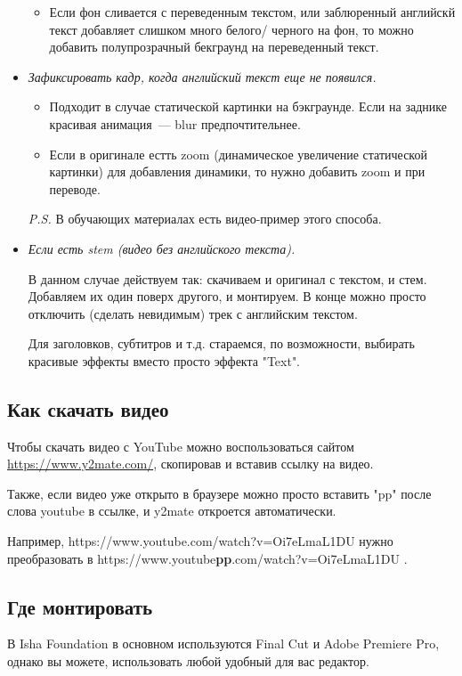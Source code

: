\documentclass[
a4paper, %
12pt, %
article,
onecolumn, %
openany, %
]{memoir}
\begin{document}
\begin{itemize}
\begin{itemize}
        \item Если фон сливается с переведенным текстом, 
            или заблюренный английскй текст 
            добавляет слишком много белого/ черного на фон, то 
            можно добавить полупрозрачный бекграунд на переведенный текст.
    \end{itemize}

   \item \emph{Зафиксировать кадр, когда английский текст еще не появился.}

    \begin{itemize}
        \item Подходит в случае статической картинки на бэкграунде. Если 
        на заднике красивая анимация~--- blur предпочтительнее.
       
    \item Если в оригинале естть zoom (динамическое увеличение
        статической картинки) для добавления динамики, то нужно
        добавить zoom и при переводе.

    \end{itemize}
    \textit{P.S.} В обучающих материалах есть видео-пример этого способа.

\item \emph{Если есть stem (видео без английского текста).}
    
    В данном случае действуем так: скачиваем и оригинал с текстом,
    и стем. Добавляем их один поверх другого, и монтируем. В конце
    можно просто отключить (сделать невидимым) трек 
    с английским текстом.

    Для заголовков, субтитров и т.д. стараемся, по возможности,
    выбирать красивые эффекты вместо просто эффекта "Text".
\end{itemize}

\subsection{Как скачать видео} 
Чтобы скачать видео с YouTube можно воспользоваться сайтом
\href{https://www.y2mate.com/}{https://www.y2mate.com/}, скопировав и вставив 
ссылку на видео. 

Также, если видео уже открыто в браузере можно просто вставить "pp" после
слова youtube в ссылке, и y2mate откроется автоматически.

Например, https://www.youtube.com/watch?v=Oi7eLmaL1DU нужно преобразовать
в https://www.youtube\textbf{pp}.com/watch?v=Oi7eLmaL1DU .

\subsection{Где монтировать}
В Isha Foundation в основном используются Final Cut и Adobe Premiere Pro, 
однако вы можете, использовать любой удобный для вас редактор.
\end{document}
